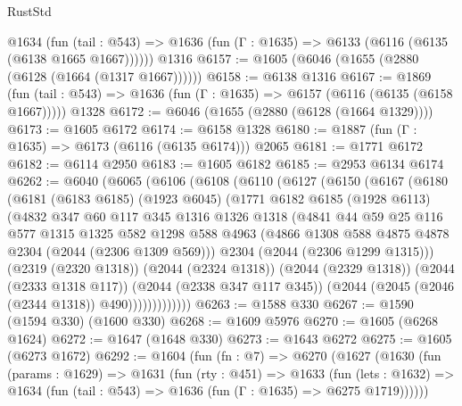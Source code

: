 \begin{lexlean}{RustStd}
\begin{coremodule}
{\begin{coremodule}
{{{{{{{{{{{{{{    @1634
      (fun (tail : @543) => @1636 (fun (Γ : @1635) => @6133 (@6116 (@6135 (@6138 @1665 @1667))))))
    @1316
@6157 := @1605 (@6046 (@1655 (@2880 (@6128 (@1664 (@1317 @1667))))))
@6158 := @6138 @1316
@6167 := @1869
    (fun (tail : @543) => @1636 (fun (Γ : @1635) => @6157 (@6116 (@6135 (@6158 @1667)))))
    @1328
@6172 := @6046 (@1655 (@2880 (@6128 (@1664 @1329))))
@6173 := @1605 @6172
@6174 := @6158 @1328
@6180 := @1887 (fun (Γ : @1635) => @6173 (@6116 (@6135 @6174))) @2065
@6181 := @1771 @6172
@6182 := @6114 @2950
@6183 := @1605 @6182
@6185 := @2953 @6134 @6174
@6262 := @6040
    (@6065
      (@6106
        (@6108
          (@6110
            (@6127
              (@6150
                (@6167
                  (@6180
                    (@6181
                      (@6183 @6185)
                      (@1923 @6045)
                      (@1771
                        @6182
                        @6185
                        (@1928 @6113)
                        (@4832
                          @347
                          @60
                          @117
                          @345
                          @1316
                          @1326
                          @1318
                          (@4841
                            @44
                            @59
                            @25
                            @116
                            @577
                            @1315
                            @1325
                            @582
                            @1298
                            @588
                            @4963
                            (@4866 @1308 @588 @4875 @4878 @2304 (@2044 (@2306 @1309 @569)))
                            @2304
                            (@2044 (@2306 @1299 @1315)))
                          (@2319 (@2320 @1318))
                          (@2044 (@2324 @1318))
                          (@2044 (@2329 @1318))
                          (@2044 (@2333 @1318 @117))
                          (@2044 (@2338 @347 @117 @345))
                          (@2044 (@2045 (@2046 (@2344 @1318)) @490)))))))))))))
@6263 := @1588 @330
@6267 := @1590 (@1594 @330) (@1600 @330)
@6268 := @1609 @5976
@6270 := @1605 (@6268 @1624)
@6272 := @1647 (@1648 @330)
@6273 := @1643 @6272
@6275 := @1605 (@6273 @1672)
@6292 := @1604
    (fun (fn : @7) =>
    @6270
      (@1627
        (@1630
          (fun (params : @1629) =>
          @1631
            (fun (rty : @451) =>
            @1633
              (fun (lets : @1632) =>
              @1634 (fun (tail : @543) => @1636 (fun (Γ : @1635) => @6275 @1719))))))
}}}}}}}}}}}}}}
\end{coremodule}}
\end{coremodule}
\end{lexlean}
